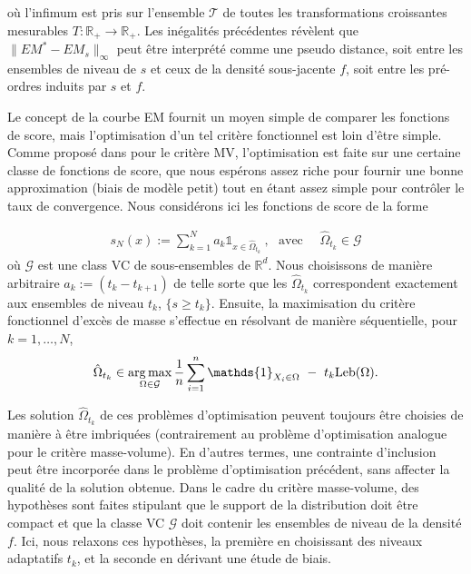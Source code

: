 \documentclass[a4paper, 12pt]{article}
\def\rset{\mathbb{R}}
\def\leb{\text{Leb}}
\def\argmax{\operatornamewithlimits{arg\,max}}
\begin{document}
où l'infimum est pris sur l'ensemble $ \mathcal {T} $ de toutes les transformations croissantes mesurables $T: \mathbb {R} _ + \rightarrow \mathbb {R} _ + $.
Les inégalités précédentes révèlent que $ \| EM ^ * - EM_s \| _ \infty $ peut être interprété comme une pseudo distance, soit entre les ensembles de niveau de $ s $ et ceux de la densité sous-jacente $ f $, soit entre les pré-ordres induits par $ s $ et $ f $.

Le concept de la courbe EM fournit un moyen simple de comparer les fonctions de score, mais l'optimisation d'un tel critère fonctionnel est loin d'être simple. Comme proposé dans \cite {CLEM13} pour le critère MV, l'optimisation est faite sur une certaine classe de fonctions de score, que nous espérons assez riche pour fournir une bonne approximation (biais de modèle petit) tout en étant assez simple pour contrôler le taux de convergence. Nous considérons ici les fonctions de score de la forme

\begin{align*}
s_N(x):= \sum_{k=1}^N a_k \mathds{1}_{x \in \hat{\Omega}_{t_k} }~, ~~~\text{avec ~~~} \hat{\Omega}_{t_k}  \in \mathcal{G}
\end{align*}
où $\mathcal{G}$ est une class VC de sous-ensembles de $\rset^d$.
Nous choisissons de manière arbitraire $a_k:= (t_k-t_{k+1})$ de telle sorte que les $\hat{\Omega}_{t_k}$ correspondent exactement aux ensembles de niveau $t_k$, $\{s \ge t_k\}$. Ensuite, la maximisation du critère fonctionnel d'excès de masse s'effectue en résolvant de manière séquentielle, pour $k=1,\ldots,N$,
\begin{align*}
\hat \Omega_{t_k} \in \argmax_{\Omega \in \mathcal{G}} \frac{1}{n}\sum_{i=1}^n\mathds{1}_{X_i \in \Omega}~-~t_k \leb(\Omega).
\end{align*}

Les solution $ \hat \Omega_ {t_k} $ de ces problèmes d'optimisation peuvent toujours être choisies de manière à être imbriquées (contrairement au problème d'optimisation analogue pour le critère masse-volume). En d'autres termes, une contrainte d'inclusion peut être incorporée dans le problème d'optimisation précédent, sans affecter la qualité de la solution obtenue. Dans le cadre du critère masse-volume, des hypothèses sont faites stipulant que le support de la distribution doit être compact et que la classe VC $ \mathcal {G} $ doit contenir les ensembles de niveau de la densité $f$. Ici, nous relaxons ces hypothèses, la première en choisissant des niveaux adaptatifs $ t_k $, et la seconde en dérivant une étude de biais. %
\end{document}
